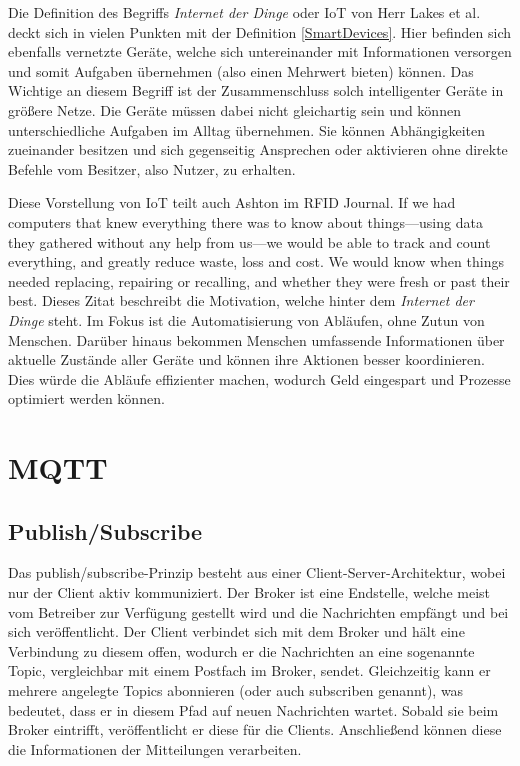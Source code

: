         Die Definition des Begriffs \emph{Internet der Dinge} oder \ac{IoT} von Herr Lakes et al. deckt sich in vielen Punkten mit der Definition \ref{SmartDevices}. Hier befinden sich ebenfalls vernetzte Geräte, welche sich untereinander mit Informationen versorgen und somit Aufgaben übernehmen (also einen Mehrwert bieten) können. Das Wichtige an diesem Begriff ist der Zusammenschluss solch intelligenter Geräte in größere Netze. Die Geräte müssen dabei nicht gleichartig sein und können unterschiedliche Aufgaben im Alltag übernehmen. Sie können Abhängigkeiten zueinander besitzen und sich gegenseitig Ansprechen oder aktivieren ohne direkte Befehle vom Besitzer, also Nutzer, zu erhalten.
        
        Diese Vorstellung von \ac{IoT} teilt auch Ashton im RFID Journal.
        \glqq If we had computers that knew everything there was to know about things—using data they gathered without any help from us—we would be able to track and count everything, and greatly reduce waste, loss and cost. We would know when things needed replacing, repairing or recalling, and whether they were fresh or past their best.\grqq{} \cite{ashton2009internet}
        Dieses Zitat beschreibt die Motivation, welche hinter dem \emph{Internet der Dinge} steht.
        Im Fokus ist die Automatisierung von Abläufen, ohne Zutun von Menschen. Darüber hinaus bekommen Menschen umfassende Informationen über aktuelle Zustände aller Geräte und können ihre Aktionen besser koordinieren. Dies würde die Abläufe effizienter machen, wodurch Geld eingespart und Prozesse optimiert werden können.

\section{MQTT} \label{MQTT}
    \subsection{Publish/Subscribe}
    Das publish/subscribe-Prinzip besteht aus einer Client-Server-Architektur, wobei nur der Client aktiv kommuniziert. Der Broker ist eine Endstelle, welche meist vom Betreiber zur Verfügung gestellt wird und die Nachrichten empfängt und bei sich veröffentlicht. Der Client verbindet sich mit dem Broker und hält eine Verbindung zu diesem offen, wodurch er die Nachrichten an eine sogenannte Topic, vergleichbar mit einem Postfach im Broker, sendet. Gleichzeitig kann er mehrere angelegte Topics abonnieren (oder auch  \glqq subscriben\grqq{} genannt), was bedeutet, dass er in diesem Pfad auf neuen Nachrichten wartet. Sobald sie beim Broker eintrifft, veröffentlicht er diese für die Clients. Anschließend können diese die Informationen der Mitteilungen verarbeiten. \cite{Redbooks2012}

